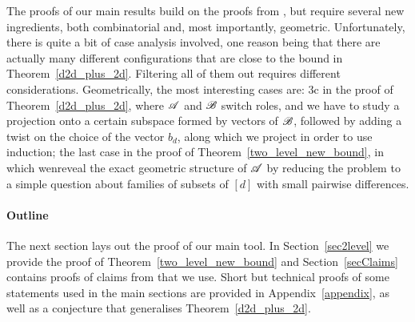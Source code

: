 The proofs of our main results build on the proofs from \cite{kupavskii22}, but require several new ingredients, both combinatorial and, most importantly, geometric. Unfortunately, there is quite a bit of case analysis involved, one reason being that there are actually many different configurations that are close to the bound in Theorem~\ref{d2d_plus_2d}. Filtering all of them out requires different considerations. Geometrically, the most interesting cases are: 3c in the proof of Theorem~\ref{d2d_plus_2d}, where ${\mathscr{A}}$ and ${\mathscr{B}}$ switch roles, and we have to study a projection onto a certain subspace formed by vectors of ${\mathscr{B}}$, followed by adding a twist on the choice of the vector $b_d$, along which we project in order to use induction; the last case in the proof of Theorem~\ref{two_level_new_bound}, in which wenreveal the exact geometric structure of ${\mathscr{A}}$ by reducing the problem to a simple question about families of subsets of $[d]$ with small pairwise differences.  

\paragraph{Outline}
The next section lays out the proof of our main tool. In Section~\ref{sec2level} we provide the proof of Theorem~\ref{two_level_new_bound} and Section~\ref{secClaims} contains proofs of claims from \cite{kupavskii22} that we use. Short but technical proofs of some statements used in the main sections are provided in Appendix~\ref{appendix}, as well as a conjecture that generalises Theorem~\ref{d2d_plus_2d}.